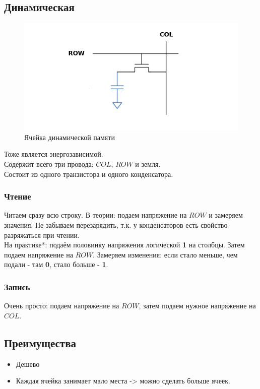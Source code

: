 \documentclass[12pt, a4paper]{article}
\begin{document}
\subsection{Динамическая}
\begin{figure}
    \centering
    \includegraphics[scale=0.5]{./images/DRAM.png}
    \caption{Ячейка динамической памяти}
    \label{fig:DRAM}
\end{figure}
Тоже является энергозависимой.\\ 
Содержит всего три провода: $COL$, $ROW$ и земля.\\
Состоит из одного транзистора и одного конденсатора.
\subsubsection{Чтение}
Читаем сразу всю строку. В теории: подаем напряжение на $ROW$ и замеряем значения. Не забываем перезарядить, т.к. у конденсаторов есть свойство разряжаться при чтении.\\
На практике*: подаём половинку напряжения логической \textbf{1} на столбцы. Затем подаем напряжение на $ROW$. Замеряем изменения: если стало меньше, чем подали - там \textbf{0}, стало больше - \textbf{1}.
\subsubsection{Запись}
Очень просто: подаем напряжение на $ROW$, затем подаем нужное напряжение на $COL$.
\subsection{Преимущества}
\begin{itemize}
    \item Дешево
    \item Каждая ячейка занимает мало места -> можно сделать больше ячеек.
\end{itemize}
\end{document}
